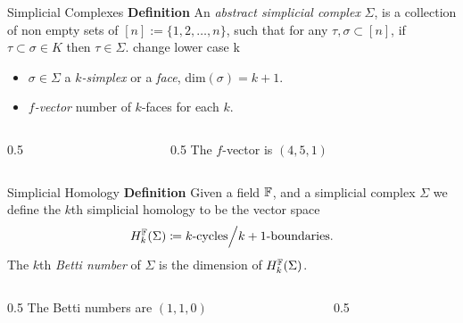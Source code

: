 \documentclass[9pt]{beamer}
\renewenvironment{definition}[1][]
{\textcolor{LineColor}{\textbf{Definition #1}} }
{}
\begin{document}
\begin{frame}[fragile]{Simplicial Complexes}
  \begin{definition}
    An \emph{abstract simplicial complex} $\Sigma$, is a collection of non empty sets of $[n] := \{1, 2,\ldots, n\}$,
      such that for any $\tau, \sigma \subset [n]$, if $\tau \subset  \sigma \in K$ then $\tau \in \Sigma$.
      \vspace{8mm}
      change lower case k
    \begin{itemize}
    \item $\sigma \in \Sigma$ a \emph{$k$-simplex} or a \emph{face}, dim$(\sigma) = k + 1$.
    \item \emph{$f$-vector} number of $k$-faces for each $k$.
    \end{itemize}
  \end{definition}
  \pause
  \begin{columns}
    \begin{column}{0.5\textwidth}
      \centering
      
    \end{column}

    \begin{column}{0.5\textwidth}
      The $f$-vector is $(4, 5, 1)$
    \end{column}
  \end{columns}
\end{frame}


\begin{frame}[fragile]{Simplicial Homology}
  \begin{definition}
    Given a field ${\mathbb F}$, and a simplicial complex $\Sigma$ we define the
    $k$th simplicial homology to be the vector space
    \[
      H_k^{{\mathbb F}}(\Sigma) \coloneq {k \text{-cycles}}\Big/{ k + 1 \text{-boundaries} }.
    \]
    The $k$th \emph{Betti number} of $\Sigma$ is the dimension of $H_k^{{\mathbb F}}(\Sigma)$.
  \end{definition}
  \pause
  \begin{columns}
    \begin{column}{0.5\textwidth}
      The Betti numbers are $(1, 1, 0)$
    \end{column}

    \begin{column}{0.5\textwidth}
      \centering
      
    \end{column}
  \end{columns}
\end{frame}
\end{document}
